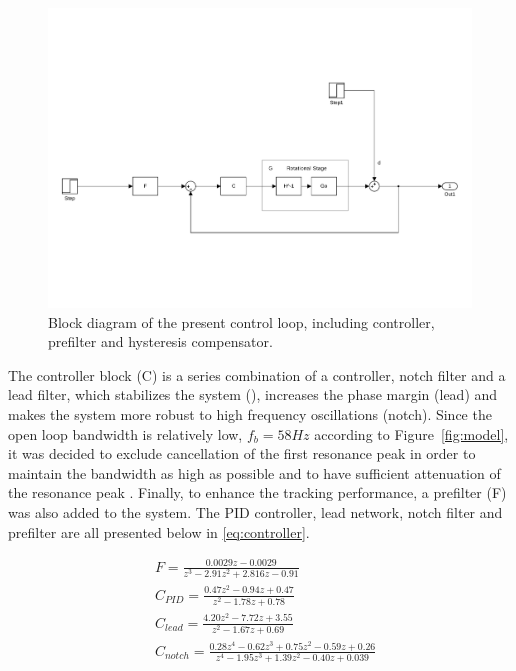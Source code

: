 \begin{figure}[h!]
  \centering %
  \includegraphics[width=1\textwidth, trim=4cm 3cm 2.1cm 10cm, clip=true]{fig/matlab/present_controller}
  \caption{\label{fig:present}Block diagram of the present control loop, including controller, prefilter and hysteresis compensator.}
\end{figure}

The controller block (C) is a series combination of a \abbrPID controller, notch filter and a lead filter, which stabilizes the system (\abbrPID), increases the phase margin (lead) and makes the system more robust to high frequency oscillations (notch). Since the open loop bandwidth is relatively low, $f_b = 58 Hz$ according to Figure~\ref{fig:model}, it was decided to exclude cancellation of the first resonance peak in order to maintain the bandwidth as high as possible and to have sufficient attenuation of the resonance peak \citep{ButcherController:2015}. Finally, to enhance the tracking performance, a prefilter (F) was also added to the system. The PID controller, lead network, notch filter and prefilter are all presented below in \eqref{eq:controller}.

\begin{subequations}
  \label{eq:controller}
\begin{alignat}{2}
  \label{eq:pre}
  & F = \frac{0.0029z - 0.0029}{z^3 - 2.91z^2 + 2.816 z - 0.91} \\
  \label{eq:pid}
  & C_{PID} = \frac{0.47z^2 - 0.94z + 0.47}{z^2 - 1.78 z + 0.78} \\
  \label{eq:lead}
  & C_{lead} = \frac{4.20 z^2 - 7.72z + 3.55}{z^2 - 1.67z + 0.69} \\
  \label{eq:notch}
  & C_{notch} = \frac{0.28z^4 - 0.62z^3 + 0.75z^2 - 0.59z + 0.26}{z^4 - 1.95z^3 + 1.39z^2 - 0.40z + 0.039}
\end{alignat}
\end{subequations}

